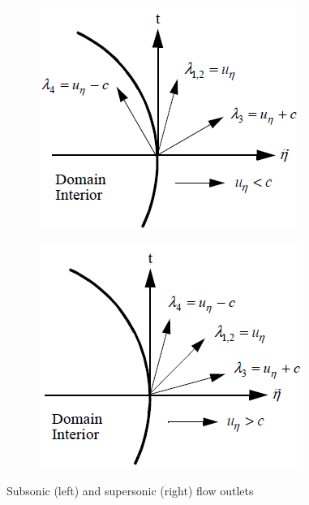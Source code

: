 %
%
\begin{figure}[H]
        \centering
        \begin{subfigure}[b]{0.495\textwidth}
                \centering
                \includegraphics[width=\textwidth]{figures/sub_exit_bc.png}
                \caption{\label{fig:sub_flow_outlet}}
        \end{subfigure}%
        \begin{subfigure}[b]{0.495\textwidth}
                \centering
                \includegraphics[width=\textwidth]{figures/sup_exit_bc.png}
                \caption{\label{fig:sup_flow_outlet}}
        \end{subfigure}
        \caption{Subsonic (left) and supersonic (right) flow outlets\label{fig:outlet_sct3}}
\end{figure}
